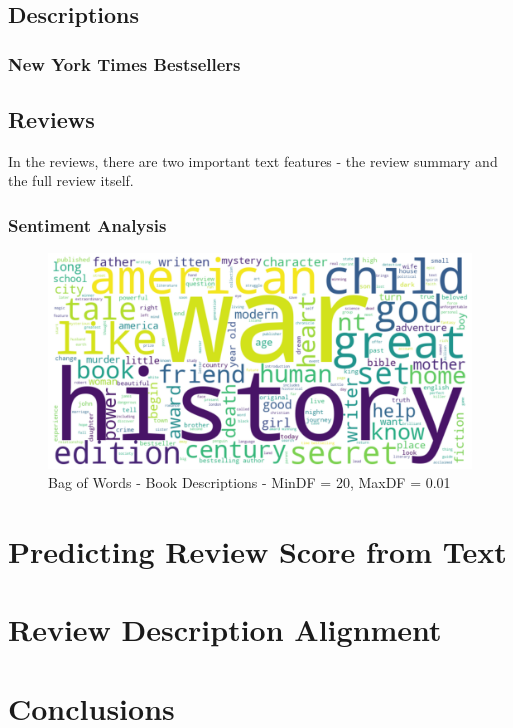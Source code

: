 \documentclass[12pt]{article}
\numberwithin{equation}{section}
\begin{document}
\subsection{Descriptions}

\subsubsection{New York Times Bestsellers}

\subsection{Reviews}
In the reviews, there are two important text features - the review summary and the full review itself.


\subsubsection{Sentiment Analysis}

\begin{figure}
    \centering
    \includegraphics[scale=0.58]{bow_descriptions.png}
    \caption{Bag of Words - Book Descriptions - MinDF = 20, MaxDF = 0.01}
\end{figure}

\section{Predicting Review Score from Text}

\section{Review Description Alignment}

\section{Conclusions}
\vspace{1em} 


%
%

\newpage
\printbibliography[heading=bibintoc]
\end{document}
